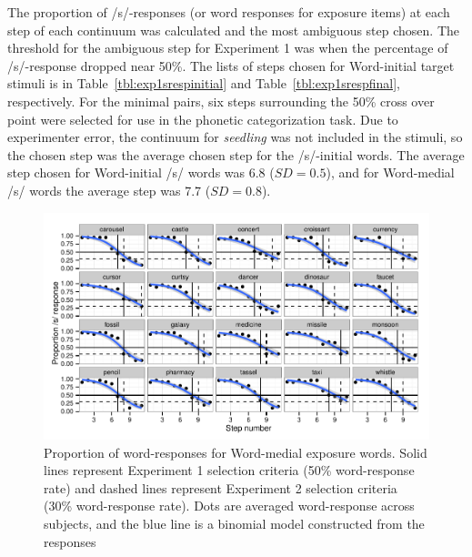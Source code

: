 The proportion of /s/-responses (or word responses for exposure items) at each step of each continuum was calculated and the most ambiguous step chosen. 
The threshold for the ambiguous step for Experiment 1 was when the percentage of /s/-response dropped near 50\%. 
The lists of steps chosen for Word-initial target stimuli is in Table~\ref{tbl:exp1srespinitial} and Table~\ref{tbl:exp1srespfinal}, respectively.
For the minimal pairs, six steps surrounding the 50\% cross over point were selected for use in the phonetic categorization task.  
Due to experimenter error, the continuum for \emph{seedling} was not included in the stimuli, so the chosen step was the average chosen step for the /s/-initial words.  
The average step chosen for Word-initial /s/ words was 6.8 ($SD = 0.5$), and for Word-medial /s/ words the average step was 7.7 ($SD = 0.8$).

\begin{figure}
\includegraphics[width=\textwidth]{graphs/sfinalpretest.pdf}
\caption{Proportion of word-responses for Word-medial exposure words. Solid lines represent Experiment 1 selection criteria (50\% word-response rate) and dashed lines represent Experiment 2 selection criteria (30\% word-response rate).  Dots are averaged word-response across subjects, and the blue line is a binomial model constructed from the responses}
\end{figure}


